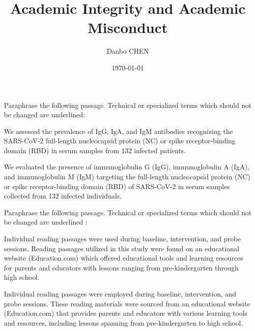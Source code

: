 \documentclass{homework}
\author{Danbo CHEN}
\date{\today}
\title{Academic Integrity and Academic Misconduct}
\begin{document}
 \maketitle

\question Paraphrase the following passage. Technical or specialized terms which should not be changed are underlined:

We assessed the prevalence of IgG, IgA, and IgM antibodies recognizing the SARS-CoV-2 full-length nucleocapsid protein (NC) or spike receptor-binding domain (RBD) in serum samples from 132 infected patients.

\begin{sol}

We evaluated the presence of immunoglobulin G (IgG), immunoglobulin A (IgA), and immunoglobulin M (IgM) targeting the full-length nucleocapsid protein (NC) or spike receptor-binding domain (RBD) of SARS-CoV-2 in serum samples collected from 132 infected individuals.

  
\end{sol}

\question Paraphrase the following passage. Technical or specialized terms which should not  be changed are  underlined :

Individual reading passages were used during baseline, intervention, and probe sessions. Reading passages utilized in this study were found on an educational website (Education.com) which offered educational tools and learning resources for parents and educators with lessons ranging from pre-kindergarten through high school.

\begin{sol}

Individual reading passages were employed during baseline, intervention, and probe sessions. These reading materials were sourced from an educational website (Education.com) that provides parents and educators with various learning tools and resources, including lessons spanning from pre-kindergarten to high school.

\end{sol}



% 
% 
\end{document}
